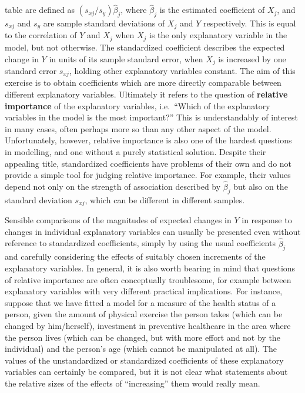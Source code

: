\begin{itemize}
table are defined as $(s_{xj}/s_{y})\hat{\beta}_{j}$, where
$\hat{\beta}_{j}$ is the estimated coefficient of $X_{j}$, and $s_{xj}$
and $s_{y}$ are sample standard deviations of $X_{j}$ and $Y$
respectively. This is equal to the correlation of $Y$ and $X_{j}$ when
$X_{j}$ is the only explanatory variable in the model, but not
otherwise. The standardized coefficient describes the expected change in
$Y$ in units of its sample standard error, when $X_{j}$ is increased by
one standard error $s_{xj}$, holding other explanatory variables
constant. The aim of this exercise is to obtain coefficients which are
more directly comparable between different explanatory variables.
Ultimately it refers to the question of \textbf{relative importance} of
the explanatory variables, i.e.\ ``Which of the explanatory variables in
the model is the most important?'' This is understandably of interest in
many cases, often perhaps more so than any other aspect of the model.
Unfortunately, however, relative importance is also one of the hardest
questions in modelling, and one without a purely statistical solution.
Despite their appealing title, standardized coefficients have problems
of their own and do not provide a simple tool for judging relative
importance. For example, their values depend not only on the strength of
association described by $\hat{\beta}_{j}$ but also on the standard
deviation $s_{xj}$, which can be different in different samples.

Sensible comparisons of the magnitudes of expected changes in $Y$ in
response to changes in individual explanatory variables can usually be
presented even without reference to standardized coefficients, simply by
using the usual coefficients $\hat{\beta}_{j}$ and carefully considering
the effects of suitably chosen increments of the explanatory variables.
In general, it is also worth bearing in mind that questions of relative
importance are often conceptually troublesome, for example between
explanatory variables with very different practical implications. For
instance, suppose that we have fitted a model for a measure of the
health status of a person, given the amount of physical exercise the
person takes (which can be changed by him/herself), investment in
preventive healthcare in the area where the person lives (which can be
changed, but with more effort and not by the individual) and the
person's age (which cannot be manipulated at all). The values of the
unstandardized or standardized coefficients of these explanatory
variables can certainly be compared, but it is not clear what statements
about the relative sizes of the effects of ``increasing'' them would
really mean. \end{itemize}


